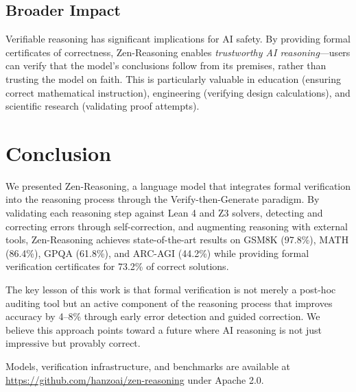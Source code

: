 \documentclass[11pt,a4paper]{article}
\begin{document}
\subsection{Broader Impact}

Verifiable reasoning has significant implications for AI safety. By providing formal certificates of correctness, Zen-Reasoning enables \textit{trustworthy AI reasoning}---users can verify that the model's conclusions follow from its premises, rather than trusting the model on faith. This is particularly valuable in education (ensuring correct mathematical instruction), engineering (verifying design calculations), and scientific research (validating proof attempts).

\section{Conclusion}
\label{sec:conclusion}

We presented Zen-Reasoning, a language model that integrates formal verification into the reasoning process through the Verify-then-Generate paradigm. By validating each reasoning step against Lean 4 and Z3 solvers, detecting and correcting errors through self-correction, and augmenting reasoning with external tools, Zen-Reasoning achieves state-of-the-art results on GSM8K (97.8\%), MATH (86.4\%), GPQA (61.8\%), and ARC-AGI (44.2\%) while providing formal verification certificates for 73.2\% of correct solutions.

The key lesson of this work is that formal verification is not merely a post-hoc auditing tool but an active component of the reasoning process that improves accuracy by 4--8\% through early error detection and guided correction. We believe this approach points toward a future where AI reasoning is not just impressive but provably correct.

Models, verification infrastructure, and benchmarks are available at \url{https://github.com/hanzoai/zen-reasoning} under Apache 2.0.
\end{document}
